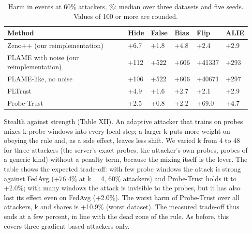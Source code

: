 \documentclass[journal]{IEEEtran}
\begin{document}
\begin{table}[!t]
\caption{Harm in events at 60\% attackers, \%: median over three datasets and five seeds. Values of 100 or more are rounded.}
\centering
\footnotesize
\renewcommand{\arraystretch}{1.12}
\begin{tabular}{|>{\raggedright\arraybackslash}p{5.95cm}|>{\raggedright\arraybackslash}p{1.55cm}|>{\raggedright\arraybackslash}p{1.55cm}|>{\raggedright\arraybackslash}p{1.55cm}|>{\raggedright\arraybackslash}p{1.55cm}|>{\raggedright\arraybackslash}p{1.55cm}|}
\hline
\textbf{Method} & \textbf{Hide} & \textbf{False} & \textbf{Bias} & \textbf{Flip} & \textbf{ALIE} \\
\hline
Zeno++ (our reimplementation) & +6.7 & +1.8 & +4.8 & +2.4 & +2.9 \\
\hline
FLAME with noise (our reimplementation) & +112 & +522 & +606 & +41337 & +293 \\
\hline
FLAME-like, no noise & +106 & +522 & +606 & +40671 & +297 \\
\hline
FLTrust & +4.9 & +1.6 & +2.7 & +2.1 & +2.9 \\
\hline
Probe-Trust & +2.5 & +0.8 & +2.2 & +69.0 & +4.7 \\
\hline
\end{tabular}
\end{table}
Stealth against strength (Table XII). An adaptive attacker that trains on probes mixes k probe windows into every local step; a larger k puts more weight on obeying the rule and, as a side effect, leaves less shift. We varied k from 4 to 48 for three attackers (the server's exact probes, the attacker's own probes, probes of a generic kind) without a penalty term, because the mixing itself is the lever. The table shows the expected trade-off: with few probe windows the attack is strong against FedAvg (+76.4\% at k = 4, 60\% attackers) and Probe-Trust holds it to +2.0\%; with many windows the attack is invisible to the probes, but it has also lost its effect even on FedAvg (+2.0\%). The worst harm of Probe-Trust over all attackers, k and shares is +10.9\% (worst dataset). The measured trade-off thus ends at a few percent, in line with the dead zone of the rule. As before, this covers three gradient-based attackers only.
\end{document}
